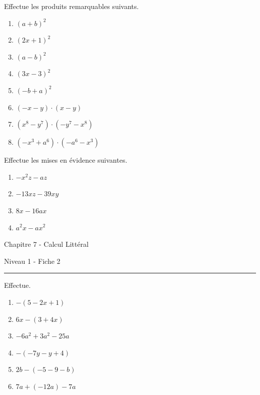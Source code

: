 \documentclass[12pt,parskip=half-, twoside=semi]{scrartcl}
\begin{document}
\begin{exercise} Effectue les produits remarquables suivants.
  \begin{enumerate}[cols=2]
    \item $(a+b)^2$
    \item $(2 x+1)^2$
    \item $(a-b)^2$
    \item $(3 x-3)^2$
    \item $(-b+a)^2$
    \item $(-x-y) \cdot(x-y)$
    \item $\left(x^8-y^7\right) \cdot\left(-y^7-x^8\right)$
    \item $\left(-x^3+a^6\right) \cdot\left(-a^6-x^3\right)$
  \end{enumerate}
\end{exercise}

\begin{exercise} Effectue les mises en évidence suivantes.
  \begin{enumerate}[cols=2]
    \item $-x^2 z-a z$
    \item $-13 x z-39 x y$
    \item $8x-16ax$
    \item $a^2x -ax^2$
  \end{enumerate}
\end{exercise}



\begin{center}
  \bfseries
  \begin{Huge}
    Chapitre 7 - Calcul Littéral
  \end{Huge}
  \smallbreak
  \begin{large}
    Niveau 1  - Fiche 2
  \end{large}
  \smallbreak
  \rule[10pt]{.5\linewidth}{1 pt}
\end{center}

\setcounter{exercise}{0}
\begin{exercise} Effectue.
  \begin{enumerate}[cols=3]
      \item \(-(5-2 x+1)\)
      \item \(6 x-(3+4 x)\)
      \item \(-6 a^2+3 a^2-25 a\)
      \item \(-(-7 y-y+4)\)
      \item \(2 b-(-5-9-b)\)
      \item \(7 a+(-12 a)-7 a\)
  \end{enumerate}
\end{exercise}
\end{document}

